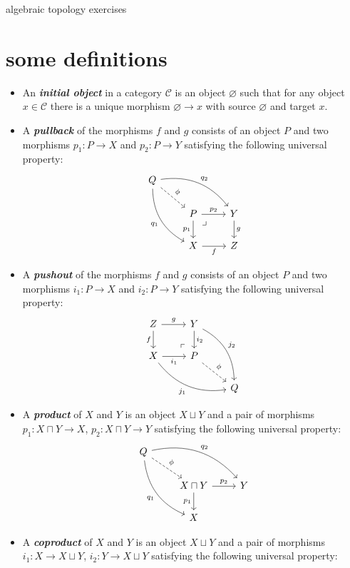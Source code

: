 \documentclass{article}
\numberwithin{equation}{section}
\newcommand{\Cc}{\mathcal{C}}
\begin{document}
{\LARGE algebraic topology exercises}
\tableofcontents
\section{some definitions}
\begin{defn}\leavevmode
	\begin{itemize}
		\item An \textbf{\textit{initial object}} in a category $\Cc$ is an object $\varnothing$ such that for any object $x\in\Cc$ there is a unique morphism $\varnothing\to x$ with source $\varnothing$ and target $x$.
		
		\item A \textbf{\textit{pullback}} of the morphisms $f$ and $g$ consists of an object $P$ and two morphisms $p_1:P\to X$ and $p_2:P\to Y$ satisfying the following universal property:
	\[\begin{tikzcd}
		Q\arrow[rrd,bend left,"q_2"]\arrow[ddr,"q_1",swap,bend right]\arrow[dr,dashed,"\phi"]\\
		&P\arrow[r,"p_2"] \arrow[rd, phantom, "\lrcorner", very near start]\arrow[d,"p_1",swap]&Y\arrow[d,"g"]\\
		&X\arrow[r,"f",swap]&Z
	\end{tikzcd}\]
	\item A \textbf{\textit{pushout}} of the morphisms $f$ and $g$ consists of an object $P$ and two morphisms $i_1:P\to X$ and $i_2:P\to Y$ satisfying the following universal property:
	\[\begin{tikzcd}
		Z\arrow[r,"g"]\arrow[d,swap,"f"]&Y\arrow[d,"i_2"]\arrow[ddr,bend left,"j_2"]\\
		X\arrow[r,"i_1",swap]\arrow[drr,bend right,swap,"j_1"]&P\arrow[ul, phantom, "\ulcorner", very near start]\arrow[dr,dashed,"\phi"]\\
		&&Q
	\end{tikzcd}\]
	\item A \textbf{\textit{product}} of $X$ and $Y$ is an object $X\sqcup Y$ and a pair of morphisms $p_1:X\sqcap Y\to X$, $p_2:X\sqcap Y\to Y$ satisfying the following universal property:
	\[\begin{tikzcd}
		Q\arrow[rrd,bend left,"q_2"]\arrow[ddr,"q_1",swap,bend right]\arrow[dr,dashed,"\phi"]\\
		&X\sqcap Y\arrow[r,"p_2"]\arrow[d,"p_1",swap]&Y\\
		&X
	\end{tikzcd}\]
	\item A \textbf{\textit{coproduct}} of $X$ and $Y$ is an object $X\sqcup Y$ and a pair of morphisms $i_1:X\to X\sqcup Y$, $i_2:Y\to X\sqcup Y$ satisfying the following universal property:

\end{itemize}
\end{defn}
\end{document}
